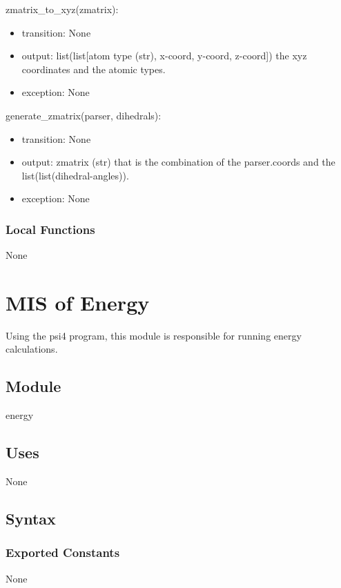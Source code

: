 \documentclass[12pt, titlepage]{article}
\begin{document}
\noindent zmatrix\_to\_xyz(zmatrix):
\begin{itemize}
	\item transition: None
	\item output: list(list[atom type (str), x-coord, y-coord, z-coord]) the 
	xyz coordinates and the atomic types.
	\item exception: None
\end{itemize}

\noindent generate\_zmatrix(parser, dihedrals):
\begin{itemize}
	\item transition: None
	\item output: zmatrix (str) that is the combination of the parser.coords 
	and the list(list(dihedral-angles)).
	\item exception: None
\end{itemize}

\subsubsection{Local Functions}

None

\section{MIS of Energy} \label{section-energies}

Using the psi4 program, this module is responsible for running energy 
calculations.

\subsection{Module}

energy

\subsection{Uses}

None

\subsection{Syntax}

\subsubsection{Exported Constants}

None
\end{document}
